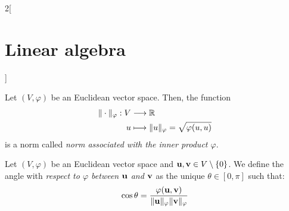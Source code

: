 \documentclass[../../../main.tex]{subfiles}
\begin{document}
\begin{multicols}{2}[\section{Linear algebra}]
\begin{definition}
\begin{enumerate}
    \end{enumerate}
  \end{definition}
  \begin{prop}
    Let $(V,\varphi)$ be an Euclidean vector space. Then, the function
    \begin{align*}
      \|\cdot\|_\varphi:V & \longrightarrow\mathbb{R}                           \\
      u                   & \longmapsto\|u\|_\varphi=\sqrt{\varphi(u,u)}
    \end{align*}
    is a norm called \textit{norm associated with the inner product $\varphi$}.
  \end{prop}
  \begin{definition}
    Let $(V,\varphi)$ be an Euclidean vector space and $\vb{u},\vb{v}\in V\setminus\{0\}$. We define the angle with \textit{respect to $\varphi$ between $\vb{u}$ and $\vb{v}$} as the unique $\theta\in[0,\pi]$ such that: $$\cos{\theta}=\frac{\varphi(\vb{u},\vb{v})}{\|\vb{u}\|_\varphi\|\vb{v}\|_\varphi}$$
  \end{definition}

\end{multicols}
\end{document}
